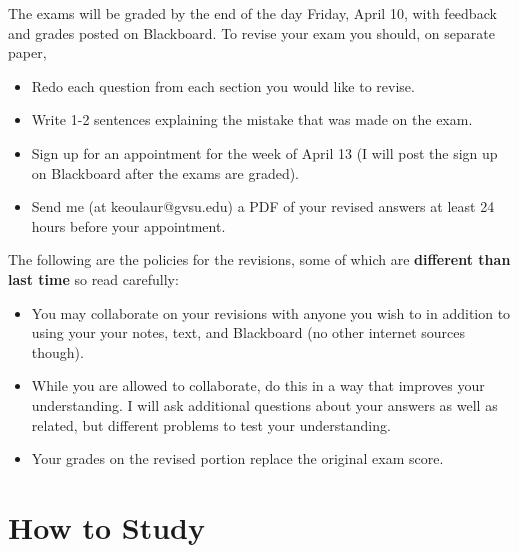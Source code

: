 \documentclass[12pt]{amsart}
\theoremstyle{definition}
\begin{document}
The exams will be graded by the end of the day Friday, April 10, with feedback and grades posted on Blackboard. 
\noindent To revise your exam you should, on separate paper, 
\begin{itemize}
\item Redo each question from each section you would like to revise. 
\item Write 1-2 sentences explaining the mistake that was made on the exam.
\item Sign up for an appointment for the week of April 13 (I will post the sign up on Blackboard after the exams are graded).
\item Send me (at keoulaur@gvsu.edu) a PDF of your revised answers at least 24 hours before your appointment.
\end{itemize}
The following are the policies for the revisions, some of which are \textbf{different than last time} so read carefully:
\begin{itemize}
\item You may collaborate on your revisions with anyone you wish to in addition to using your your notes, text, and Blackboard (no other internet sources though). 
\item While you are allowed to collaborate, do this in a way that improves your understanding. I will ask additional questions about your answers as well as related, but different problems to test your understanding. 
\item Your grades on the revised portion replace the original exam score.
\end{itemize}

\vfill

\section{How to Study}
\end{document}
